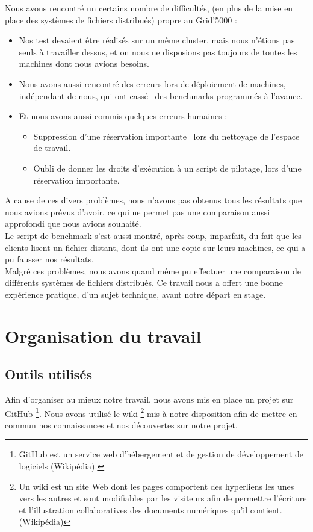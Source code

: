 \documentclass[12pt]{report}
\begin{document}
	Nous avons rencontré un certains nombre de difficultés, (en plus de la mise en place des systèmes de fichiers distribués) propre au Grid'5000 :
	\begin{itemize}
		\item Nos test devaient être réalisés sur un même cluster, mais nous n'étions pas seuls à travailler dessus,
		et on nous ne disposions pas toujours de toutes les machines dont nous avions besoins.
		\item Nous avons aussi rencontré des erreurs lors de déploiement de machines, indépendant de nous, qui ont \og cassé\fg~ des benchmarks programmés à l'avance.
		\item Et nous avons aussi commis quelques erreurs humaines :
		\begin{itemize}
			\item Suppression d'une réservation \og importante\fg~ lors du nettoyage de l'espace de travail.
			\item Oubli de donner les droits d'exécution à un script de pilotage, lors d'une réservation \og importante\fg.\\
		\end{itemize}
	\end{itemize}

	A cause de ces divers problèmes, nous n'avons pas obtenus tous les résultats que nous avions prévus d'avoir, ce qui ne permet pas une comparaison aussi approfondi
	que nous avions souhaité.\\

	Le script de benchmark s'est aussi montré, après coup, imparfait, du fait que les clients lisent un fichier distant, dont ils ont une copie sur leurs machines,
	ce qui a pu fausser nos résultats.\\

	Malgré ces problèmes, nous avons quand même pu effectuer une comparaison de différents systèmes de fichiers distribués.
	Ce travail nous a offert une bonne expérience pratique, d'un sujet technique, avant notre départ en stage.

	\appendix
		\chapter{Organisation du travail}
			\section{Outils utilisés}
				Afin d'organiser au mieux notre travail, nous avons mis en place un projet sur GitHub
				\footnote{GitHub est un service web d'hébergement et de gestion de développement de logiciels (Wikipédia).}.
				Nous avons utilisé le wiki
				\footnote{Un wiki est un site Web dont les pages comportent des hyperliens les unes vers les autres
				et sont modifiables par les visiteurs afin de permettre l'écriture et l'illustration collaboratives des documents numériques qu'il contient. (Wikipédia)}
				mis à notre disposition afin de mettre en commun nos connaissances et nos découvertes sur notre projet.
\end{document}
